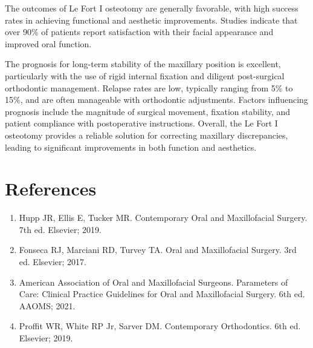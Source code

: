 The outcomes of Le Fort I osteotomy are generally favorable, with high success rates in achieving functional and aesthetic improvements. Studies indicate that over 90\% of patients report satisfaction with their facial appearance and improved oral function. 

The prognosis for long-term stability of the maxillary position is excellent, particularly with the use of rigid internal fixation and diligent post-surgical orthodontic management. Relapse rates are low, typically ranging from 5\% to 15\%, and are often manageable with orthodontic adjustments. Factors influencing prognosis include the magnitude of surgical movement, fixation stability, and patient compliance with postoperative instructions. Overall, the Le Fort I osteotomy provides a reliable solution for correcting maxillary discrepancies, leading to significant improvements in both function and aesthetics.

\section*{References}
\begin{enumerate}
  \item Hupp JR, Ellis E, Tucker MR. Contemporary Oral and Maxillofacial Surgery. 7th ed. Elsevier; 2019.
  
  \item Fonseca RJ, Marciani RD, Turvey TA. Oral and Maxillofacial Surgery. 3rd ed. Elsevier; 2017.
  
  \item American Association of Oral and Maxillofacial Surgeons. Parameters of Care: Clinical Practice Guidelines for Oral and Maxillofacial Surgery. 6th ed. AAOMS; 2021.
  
  \item Proffit WR, White RP Jr, Sarver DM. Contemporary Orthodontics. 6th ed. Elsevier; 2019.
\end{enumerate}

\clearpage

